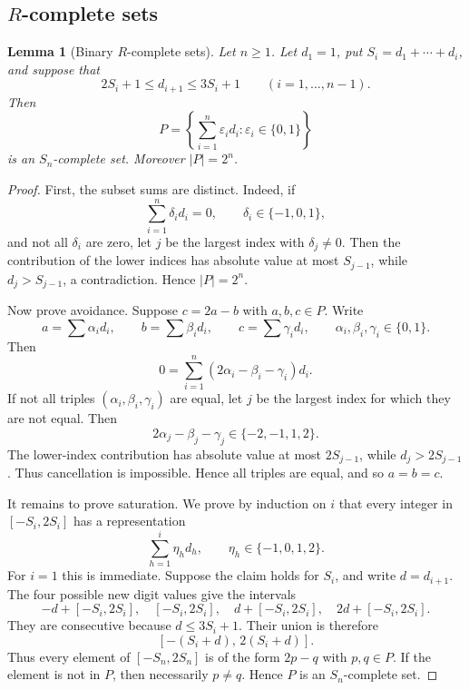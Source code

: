 \documentclass[11pt]{article}
\newtheorem{lemma}[theorem]{Lemma}
\begin{document}
	
	\subsection{$R$-complete sets}\label{sec:binary}
	
	\begin{lemma}[Binary $R$-complete sets]\label{lem:binaryinterval}
		Let $n\ge1$.  Let $d_1=1$, put $S_i=d_1+\cdots+d_i$, and suppose that
		\[
		2S_i+1\le d_{i+1}\le 3S_i+1
		\qquad (i=1,\ldots,n-1).
		\]
		Then
		\[
		P=\left\{\sum_{i=1}^n \varepsilon_i d_i:
		\varepsilon_i\in\{0,1\}\right\}
		\]
		is an $S_n$-complete set.  Moreover $|P|=2^n$.
	\end{lemma}
	
	\begin{proof}
		First, the subset sums are distinct.  Indeed, if
		\[
		\sum_{i=1}^n \delta_i d_i=0,
		\qquad \delta_i\in\{-1,0,1\},
		\]
		and not all $\delta_i$ are zero, let $j$ be the largest index with $\delta_j\ne0$.  Then the contribution of the lower indices has absolute value at most $S_{j-1}$, while $d_j>S_{j-1}$, a contradiction.  Hence $|P|=2^n$.
		
		Now prove avoidance.  Suppose $c=2a-b$ with $a,b,c\in P$.  Write
		\[
		a=\sum \alpha_i d_i,\qquad
		b=\sum \beta_i d_i,\qquad
		c=\sum \gamma_i d_i,
		\qquad
		\alpha_i,\beta_i,\gamma_i\in\{0,1\}.
		\]
		Then
		\[
		0=\sum_{i=1}^n (2\alpha_i-\beta_i-\gamma_i)d_i .
		\]
		If not all triples $(\alpha_i,\beta_i,\gamma_i)$ are equal, let $j$ be the largest index for which they are not equal.  Then
		\[
		2\alpha_j-\beta_j-\gamma_j\in\{-2,-1,1,2\}.
		\]
		The lower-index contribution has absolute value at most $2S_{j-1}$, while $d_j>2S_{j-1}$.  Thus cancellation is impossible.  Hence all triples are equal, and so $a=b=c$.
		
		It remains to prove saturation.  We prove by induction on $i$ that every integer in $[-S_i,2S_i]$ has a representation
		\[
		\sum_{h=1}^i \eta_h d_h,
		\qquad
		\eta_h\in\{-1,0,1,2\}.
		\]
		For $i=1$ this is immediate.  Suppose the claim holds for $S_i$, and write $d=d_{i+1}$.  The four possible new digit values give the intervals
		\[
		-d+[-S_i,2S_i],\quad
		[-S_i,2S_i],\quad
		d+[-S_i,2S_i],\quad
		2d+[-S_i,2S_i].
		\]
		They are consecutive because $d\le3S_i+1$.  Their union is therefore
		\[
		[-(S_i+d),\,2(S_i+d)].
		\]
		Thus every element of $[-S_n,2S_n]$ is of the form $2p-q$ with $p,q\in P$.  If the element is not in $P$, then necessarily $p\ne q$.  Hence $P$ is an $S_n$-complete set.
	\end{proof}
	
\end{document}
